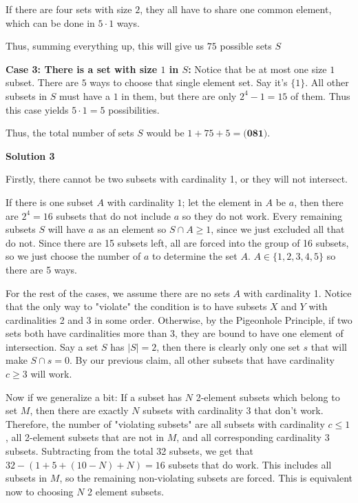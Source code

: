 \begin{enumerate}
 If there are four sets with size $2$, they all have to share one common element, which can be done in $5\cdot 1$ ways.

 Thus, summing everything up, this will give us $75$ possible sets $S$

 
\textbf{Case 3: There is a set with size $1$ in $S$:  }Notice that be at most one size $1$ subset. There are $5$ ways to choose that single element set. Say it's $\{ 1\}$. All other subsets in $S$ must have a $1$ in them, but there are only $2^4-1 = 15$ of them. Thus this case yields $5\cdot 1 = 5$ possibilities.

 
Thus, the total number of sets $S$ would be $1+75+5 = \boxed{\textbf{(081)}}$.

 



\textbf{Solution 3}

Firstly, there cannot be two subsets with cardinality 1, or they will not intersect.

 If there is one subset $A$ with cardinality $1$; let the element in $A$ be $a$, then there are $2^4=16$ subsets that do not include $a$ so they do not work. Every remaining subsets $S$ will have $a$ as an element so $S\cap{A}\geq1$, since we just excluded all that do not. Since there are 15 subsets left, all are forced into the group of 16 subsets, so we just choose the number of $a$ to determine the set $A$. $A\in\{1,2,3,4,5\}$ so there are 5 ways.

 For the rest of the cases, we assume there are no sets $A$ with cardinality 1.  Notice that the only way to "violate" the condition is to have subsets $X$ and $Y$ with cardinalities 2 and 3 in some order. Otherwise, by the Pigeonhole Principle, if two sets both have cardinalities more than 3, they are bound to have one element of intersection. Say a set $S$ has $|S|=2$, then there is clearly only one set $s$ that will make $S\cap{s}=0$. By our previous claim, all other subsets that have cardinality $c\geq{3}$ will work.

 Now if we generalize a bit: If a subset has $N$ 2-element subsets which belong to set $M$, then there are exactly $N$ subsets with cardinality 3 that don't work. Therefore, the number of "violating subsets" are all subsets with cardinality $c\leq{1}$, all 2-element subsets that are not in $M$, and all corresponding cardinality 3 subsets. Subtracting from the total 32 subsets, we get that $32-(1+5+(10-N)+N)=16$ subsets that do work. This includes all subsets in $M$, so the remaining non-violating subsets are forced. This is equivalent now to choosing $N$ 2 element subsets.


\end{enumerate}
